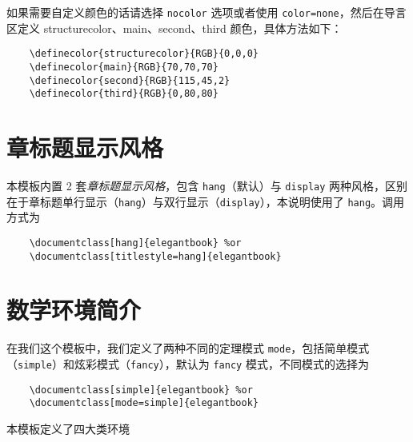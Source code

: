 	如果需要自定义颜色的话请选择 \lstinline{nocolor} 选项或者使用 \lstinline{color=none}，然后在导言区定义 structurecolor、main、second、third 颜色，具体方法如下：
	\begin{lstlisting}
	\definecolor{structurecolor}{RGB}{0,0,0}
	\definecolor{main}{RGB}{70,70,70}    
	\definecolor{second}{RGB}{115,45,2}    
	\definecolor{third}{RGB}{0,80,80}   
	\end{lstlisting}
	
	
	\section{章标题显示风格}
	
	本模板内置 2 套\textit{章标题显示风格}，包含 \lstinline{hang}（默认）与 \lstinline{display} 两种风格，区别在于章标题单行显示（\lstinline{hang}）与双行显示（\lstinline{display}），本说明使用了 \lstinline{hang}。调用方式为
	\begin{lstlisting}
	\documentclass[hang]{elegantbook} %or
	\documentclass[titlestyle=hang]{elegantbook}
	\end{lstlisting}
	
	\section{数学环境简介}
	
	在我们这个模板中，我们定义了两种不同的定理模式 \lstinline{mode}，包括简单模式（\lstinline{simple}）和炫彩模式（\lstinline{fancy}），默认为 \lstinline{fancy} 模式，不同模式的选择为
	\begin{lstlisting}
	\documentclass[simple]{elegantbook} %or
	\documentclass[mode=simple]{elegantbook}
	\end{lstlisting}
	
	本模板定义了四大类环境
	
